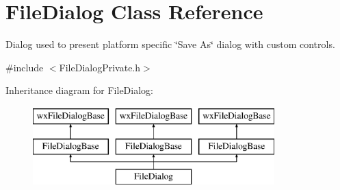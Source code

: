 \hypertarget{class_file_dialog}{}\section{File\+Dialog Class Reference}
\label{class_file_dialog}


Dialog used to present platform specific \char`\"{}\+Save As\char`\"{} dialog with custom controls.  




{\ttfamily \#include $<$File\+Dialog\+Private.\+h$>$}

Inheritance diagram for File\+Dialog\+:\begin{figure}[H]
\begin{center}
\leavevmode
\includegraphics[height=3.000000cm]{class_file_dialog}
\end{center}
\end{figure}
